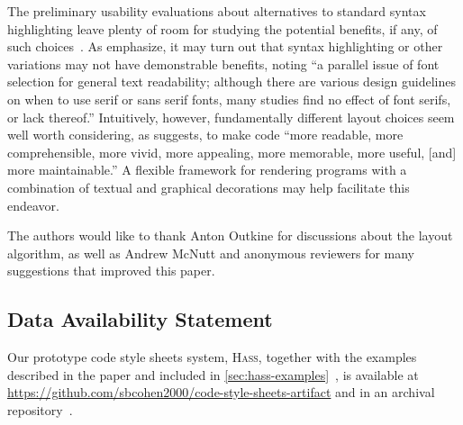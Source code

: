 \documentclass[acmsmall, screen]{acmart}
\newcommand{\refAppendixHassExamples}
  {\autoref{sec:hass-examples}~\cite{Hass}}
\newcommand{\hass}
{\textsc{Hass}}
\begin{document}
The preliminary usability evaluations about alternatives to standard syntax highlighting
leave plenty of room for studying the potential benefits, if any, of such choices~\citep{Tapp1994,Oliveira2020,Jacques2015,Talsma2021,Weintrop2019,Brown2023}.
As \citet{Brown2023} emphasize, it may turn out that syntax highlighting or other variations may not have demonstrable benefits, noting  ``a parallel issue of font selection for general text readability; although there are various design guidelines on when to use serif or sans serif fonts, many studies find no effect of font serifs, or lack thereof.''
Intuitively, however, fundamentally different layout choices seem well worth considering,
as \citet{Baecker1988} suggests, to make code ``more readable, more comprehensible, more vivid, more appealing, more memorable, more useful, [and] more maintainable.''
A flexible framework for rendering programs with a combination of textual and graphical decorations may help facilitate this endeavor.


































 
\begin{acks}

The authors would like to thank Anton Outkine for discussions about the layout algorithm, as well as Andrew McNutt and anonymous reviewers for many suggestions that improved this paper.







\end{acks}
 
\clearpage
\subsection*{Data Availability Statement}

Our prototype code style sheets system, \hass{}, together with the examples described in the paper and included in \refAppendixHassExamples{}, is available at \url{https://github.com/sbcohen2000/code-style-sheets-artifact} and in an archival repository~\cite{HassArtifact}.
\end{document}

